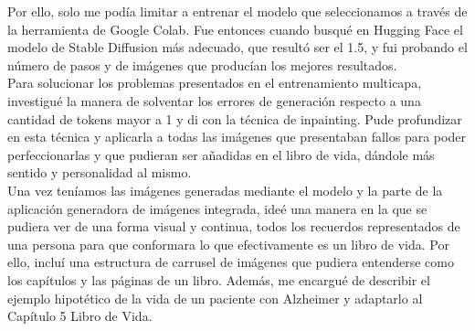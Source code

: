 Por ello, solo me podía limitar a entrenar el modelo que seleccionamos a través de la herramienta de Google Colab. Fue entonces cuando busqué en Hugging Face el modelo de Stable Diffusion más adecuado, que resultó ser el 1.5, y fui probando el número de pasos y de imágenes que producían los mejores resultados. \\

Para solucionar los problemas presentados en el entrenamiento multicapa, investigué la manera de solventar los errores de generación respecto a una cantidad de tokens mayor a 1 y di con la técnica de inpainting. Pude profundizar en esta técnica y aplicarla a todas las imágenes que presentaban fallos para poder perfeccionarlas y que pudieran ser añadidas en el libro de vida, dándole más sentido y personalidad al mismo. \\

Una vez teníamos las imágenes generadas mediante el modelo y la parte de la aplicación generadora de imágenes integrada, ideé una manera en la que se pudiera ver de una forma visual y continua, todos los recuerdos representados de una persona para que conformara lo que efectivamente es un libro de vida. Por ello, incluí una estructura de carrusel de imágenes que pudiera entenderse como los capítulos y las páginas de un libro. Además, me encargué de describir el ejemplo hipotético de la vida de un paciente con Alzheimer y adaptarlo al Capítulo 5 Libro de Vida.\\ 



